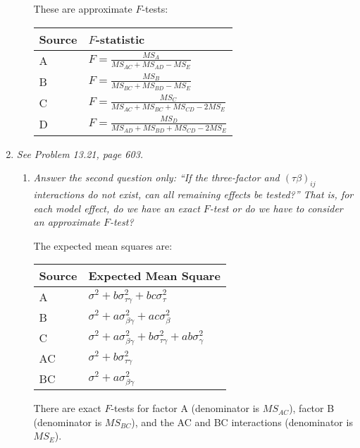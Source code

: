 \documentclass[11pt]{article}
\begin{document}
\begin{enumerate}
\begin{enumerate}
\pagebreak
These are approximate \(F\)-tests:

\begin{table}[H]\centering\renewcommand{\arraystretch}{1.5}
\begin{tabular}{|l|l|}
\hline
Source & \(F\)-statistic \\
\hline
A & \(F=\frac{MS_{A}}{MS_{AC}+MS_{AD}-MS_{E}}\) \\
\hline
B & \(F=\frac{MS_{B}}{MS_{BC}+MS_{BD}-MS_{E}}\) \\
\hline
C & \(F=\frac{MS_{C}}
{MS_{AC}+MS_{BC}+MS_{CD}-2MS_{E}}\) \\
\hline
D & \(F=\frac{MS_{D}}
{MS_{AD}+MS_{BD}+MS_{CD}-2MS_{E}}\) \\
\hline
\end{tabular}
\end{table}

\end{enumerate}

\item %
{\it See Problem 13.21, page 603.}

\begin{enumerate}

\item %
{\it Answer the second question only: ``If the three-factor and
\((\tau\beta)_{ij}\) interactions do not exist, can all remaining effects be
tested?'' That is, for each model effect, do we have an exact \(F\)-test or do
we have to consider an approximate \(F\)-test?}

The expected mean squares are:

\begin{table}[h]\centering
\begin{tabular}{|l|l|}
\hline
Source & Expected Mean Square \\
\hline
A & \(\sigma^2+b\sigma^2_{\tau\gamma}+bc\sigma^2_{\tau}\) \\
\hline
B & \(\sigma^2+a\sigma^2_{\beta\gamma}+ac\sigma^2_{\beta}\) \\
\hline
C & \(\sigma^2+a\sigma^2_{\beta\gamma}
+b\sigma^2_{\tau\gamma}+ab\sigma^2_{\gamma}\) \\
\hline
AC & \(\sigma^2+b\sigma^2_{\tau\gamma}\) \\
\hline
BC & \(\sigma^2+a\sigma^2_{\beta\gamma}\) \\
\hline
\end{tabular}
\end{table}

There are exact \(F\)-tests for factor A (denominator is \(MS_{AC}\)),
factor B (denominator is \(MS_{BC}\)), and the AC and BC interactions
(denominator is \(MS_{E}\)).


\end{enumerate}
\end{enumerate}
\end{document}
